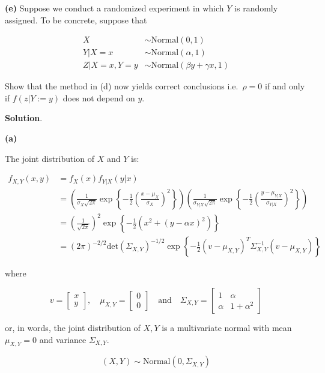 \textbf{(e)} Suppose we conduct a randomized experiment in which \(Y\)
is randomly assigned. To be concrete, suppose that

\[
\begin{align}
X &\sim \text{Normal}(0, 1) \\
Y | X = x &\sim \text{Normal}(\alpha, 1) \\
Z | X = x, Y = y &\sim \text{Normal}(\beta y + \gamma x, 1)
\end{align}
\]

Show that the method in (d) now yields correct conclusions
i.e.~\(\rho = 0\) if and only if \(f(z | Y := y)\) does not depend on
\(y\).

\textbf{Solution}.

\textbf{(a)}

The joint distribution of \(X\) and \(Y\) is:

\[ 
\begin{align}
f_{X, Y}(x, y) &= f_X(x) f_{Y | X}(y | x) \\
&= \left(\frac{1}{\sigma_X \sqrt{2\pi}} \exp \left\{-\frac{1}{2} \left(\frac{x - \mu_X}{\sigma_X}\right)^2 \right\} \right)
\left(\frac{1}{\sigma_{Y | X} \sqrt{2\pi}} \exp \left\{-\frac{1}{2} \left(\frac{y - \mu_{Y | X}}{\sigma_{Y | X}}\right)^2 \right\}\right) \\
&= \left(\frac{1}{\sqrt{2\pi}}\right)^2 \exp \left\{ -\frac{1}{2} \left( x^2 + (y - \alpha x)^2\right) \right\} \\
&= (2 \pi)^{-2 / 2} \text{det} (\Sigma_{X, Y})^{-1/2} \exp \left\{ -\frac{1}{2} (v - \mu_{X, Y})^T \Sigma_{X, Y}^{-1} (v - \mu_{X, Y})\right\}
\end{align}
\]

where

\[
v = \begin{bmatrix}x \\ y\end{bmatrix},
\quad \mu_{X, Y} = \begin{bmatrix}0 \\ 0\end{bmatrix}
\quad \text{and} \quad
\Sigma_{X, Y} = \begin{bmatrix}
1 & \alpha \\
\alpha & 1 + \alpha^2
\end{bmatrix}
\]

or, in words, the joint distribution of \(X, Y\) is a multivariate
normal with mean \(\mu_{X, Y} = 0\) and variance \(\Sigma_{X, Y}\).

\[ (X, Y) \sim \text{Normal}( 0, \Sigma_{X, Y}) \]

